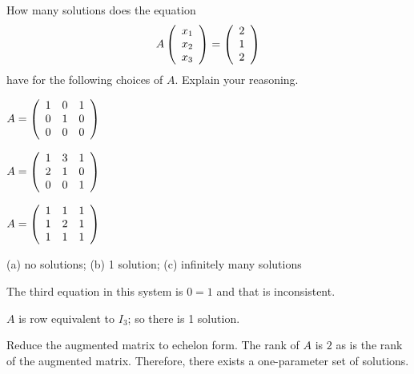 \documentclass{ximera}
\author{Marty Golubitsky}
\begin{document}
\begin{exercise}\label{C2S4_1c}

How many solutions does the equation
\[
A \left(\begin{array}{rrrrrrrrrrrrrrrrrr} x_1 \\ x_2 \\ x_3 \end{array}\right) = \left(\begin{array}{rrrrrrrrrrrrrrrrrr} 2 \\ 1 \\ 2 \end{array}\right)  
\]
have for the following choices of $A$.  Explain your reasoning.
\begin{enumeratea}
\item $A = \left(\begin{array}{rrrrrrrrrrrrrrrrrr} 1 & 0 & 1\\ 0 & 1 & 0 \\ 0 & 0 & 0 \end{array}\right)$

\item $A = \left(\begin{array}{rrrrrrrrrrrrrrrrrr} 1 & 3 & 1\\ 2 & 1 & 0 \\ 0 & 0 & 1 \end{array}\right)$

\item $A = \left(\begin{array}{rrrrrrrrrrrrrrrrrr} 1 & 1 & 1\\ 1 & 2 & 1 \\ 1 & 1 & 1 \end{array}\right)$
\end{enumeratea}


  
\begin{solution}

\ans (a) no solutions; (b) 1 solution; (c) infinitely many solutions

\soln 
\begin{enumeratea}
\item The third equation in this system is $0 = 1$ and that is inconsistent.

\item $A$ is row equivalent to $I_3$; so there is 1 solution.

\item Reduce the augmented matrix to echelon form. The rank of $A$ is $2$ as is the rank of the augmented matrix.  Therefore, there exists a one-parameter set of solutions.
\end{enumeratea}

\end{solution}
\end{exercise}
\end{document}
